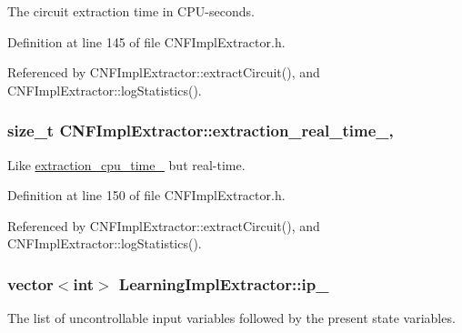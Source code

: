 The circuit extraction time in C\-P\-U-\/seconds. 



Definition at line 145 of file C\-N\-F\-Impl\-Extractor.\-h.



Referenced by C\-N\-F\-Impl\-Extractor\-::extract\-Circuit(), and C\-N\-F\-Impl\-Extractor\-::log\-Statistics().

\hypertarget{classCNFImplExtractor_ae06413cf08f868357d64545b3041aa18}{
\subsubsection[{extraction\-\_\-real\-\_\-time\-\_\-}]{\setlength{\rightskip}{0pt plus 5cm}size\-\_\-t C\-N\-F\-Impl\-Extractor\-::extraction\-\_\-real\-\_\-time\-\_\-\hspace{0.3cm}{\ttfamily [protected]}, {\ttfamily [inherited]}}}\label{classCNFImplExtractor_ae06413cf08f868357d64545b3041aa18}


Like \hyperlink{classCNFImplExtractor_ab8be06d42fd3c4b569ec22cfcf2f508e}{extraction\-\_\-cpu\-\_\-time\-\_\-} but real-\/time. 



Definition at line 150 of file C\-N\-F\-Impl\-Extractor.\-h.



Referenced by C\-N\-F\-Impl\-Extractor\-::extract\-Circuit(), and C\-N\-F\-Impl\-Extractor\-::log\-Statistics().

\hypertarget{classLearningImplExtractor_a5a4835eb5fc2df396272af43380ecc82}{
\subsubsection[{ip\-\_\-}]{\setlength{\rightskip}{0pt plus 5cm}vector$<$int$>$ Learning\-Impl\-Extractor\-::ip\-\_\-\hspace{0.3cm}{\ttfamily [protected]}}}\label{classLearningImplExtractor_a5a4835eb5fc2df396272af43380ecc82}


The list of uncontrollable input variables followed by the present state variables. 

